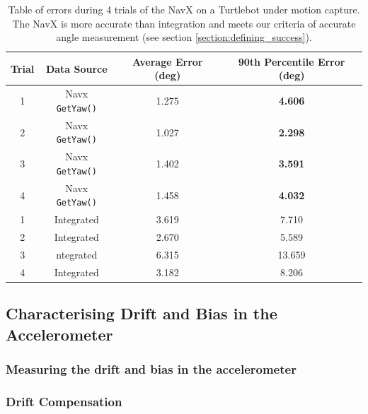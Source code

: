 \documentclass{article}
\begin{document}
    \begin{table}[H]
      \centering
      \begin{tabular}{|c|c|c|c|} \hline
        Trial & Data Source & Average Error (deg) & 90th Percentile Error (deg) \\ \hline
        1 & Navx \texttt{GetYaw()} & 1.275 & \textbf{4.606} \\ \hline
        2 & Navx \texttt{GetYaw()} & 1.027 & \textbf{2.298} \\ \hline
        3 & Navx \texttt{GetYaw()} & 1.402 & \textbf{3.591} \\ \hline
        4 & Navx \texttt{GetYaw()} & 1.458 & \textbf{4.032} \\ \hline
        1 & Integrated & 3.619 & 7.710 \\ \hline
        2 & Integrated & 2.670 & 5.589 \\ \hline
        3 & ntegrated & 6.315 & 13.659 \\ \hline
        4 & Integrated & 3.182 & 8.206 \\ \hline
      \end{tabular}
      \caption{Table of errors during 4 trials of the NavX on a Turtlebot under motion capture. The NavX is more accurate than integration and meets our criteria of accurate angle measurement (see section \ref{section:defining_success}).}
      \label{}
    \end{table}

  \subsection{Characterising Drift and Bias in the Accelerometer}

    \subsubsection{Measuring the drift and bias in the accelerometer}


    \subsubsection{Drift Compensation}
\end{document}
